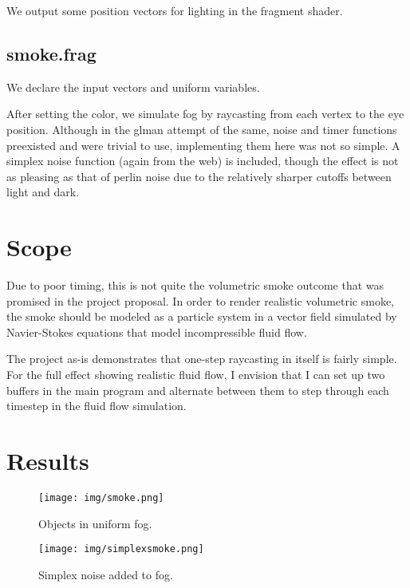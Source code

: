 \documentclass[12pt,letterpaper]{article}
\begin{document}
We output some position vectors for lighting in the fragment shader.

\subsection*{smoke.frag}

We declare the input vectors and uniform variables.

After setting the color, we simulate fog by raycasting from each vertex to the
eye position. Although in the glman attempt of the same, noise and timer
functions preexisted and were trivial to use, implementing them here was not so
simple. A simplex noise function (again from the web) is included, though the
effect is not as pleasing as that of perlin noise due to the relatively sharper
cutoffs between light and dark.

\section*{Scope}

Due to poor timing, this is not quite the volumetric smoke outcome that was
promised in the project proposal. In order to render realistic volumetric
smoke, the smoke should be modeled as a particle system in a vector field
simulated by Navier-Stokes equations that model incompressible fluid flow.

The project as-is demonstrates that one-step raycasting in itself is fairly
simple. For the full effect showing realistic fluid flow, I envision that I can
set up two buffers in the main program and alternate between them to step
through each timestep in the fluid flow simulation.

\newpage
\section*{Results}

\begin{figure}[!h]
    \centering
    \texttt{[image: img/smoke.png]}
    \caption{Objects in uniform fog.}
\end{figure}

\begin{figure}[!h]
    \centering
    \texttt{[image: img/simplexsmoke.png]}
    \caption{Simplex noise added to fog.}
\end{figure}
\end{document}
